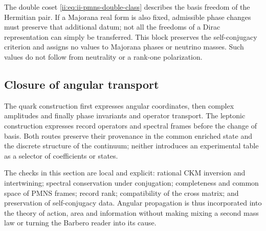 \begin{remark}
The double coset \eqref{ii:eq:ii-pmns-double-class} describes the basis freedom of the Hermitian pair. If a Majorana real form is also fixed, admissible phase changes must preserve that additional datum; not all the freedoms of a Dirac representation can simply be transferred. This block preserves the self-conjugacy criterion and assigns no values to Majorana phases or neutrino masses. Such values do not follow from neutrality or a rank-one polarization.
\end{remark}

\subsection{Closure of angular transport}

The quark construction first expresses angular coordinates, then complex amplitudes and finally phase invariants and operator transport. The leptonic construction expresses record operators and spectral frames before the change of basis. Both routes preserve their provenance in the common enriched state and the discrete structure of the continuum; neither introduces an experimental table as a selector of coefficients or states.

The checks in this section are local and explicit: rational CKM inversion and intertwining; spectral conservation under conjugation; completeness and common space of PMNS frames; record rank; compatibility of the cross matrix; and preservation of self-conjugacy data. Angular propagation is thus incorporated into the theory of action, area and information without making mixing a second mass law or turning the Barbero reader into its cause.
